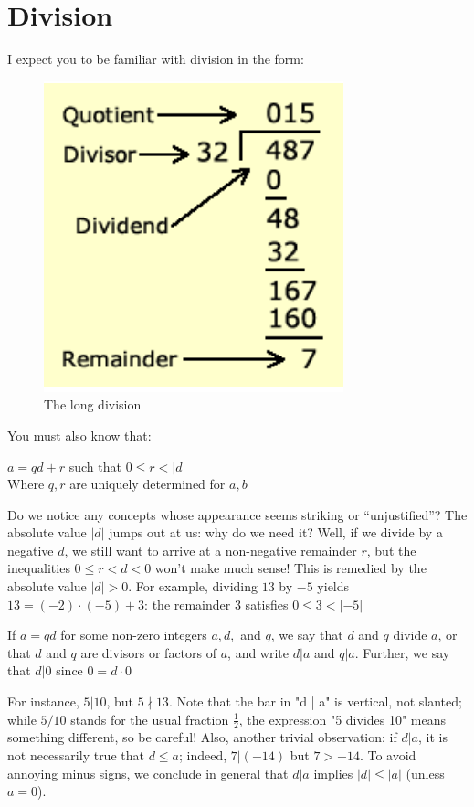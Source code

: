 \section{Division}
I expect you to be familiar with division in the form:\\
\begin{figure} [h]
    \centering
    \includegraphics[width=0.5\linewidth]{Photos/Long Divison.png}
    \caption{The long division}
\end{figure}
You must also know that:\\
\begin{theorem}
    $a = qd+r$ such that $0 \leq r <|d|$\\
    Where $q,r$ are uniquely determined for $a,b$
\end{theorem}
 Do we notice any concepts whose appearance seems striking or “unjustified”? The absolute value $|d|$ jumps out at us: why do we need it? Well, if we divide by a negative $d$, we still want to arrive at a non-negative remainder $r$, but the inequalities $0 \leq r<d< 0$ won’t make much sense! This is remedied by the absolute value $|d| > 0$. For example, dividing $13$ by $-5$ yields $13 = (-2) \cdot (-5) + 3$: the remainder $3$ satisfies $0 \leq 3 < |-5|$\\
 \begin{definition}
     If $a = qd$ for some non-zero integers $a, d,$ and $q$, we say that $d$ and $q$ divide $a$, or that $d$ and $q$ are divisors or factors of $a$, and write $d | a$ and $q | a$. Further, we say that $d | 0$ since $0 = d · 0$
 \end{definition}
For instance, $5 | 10$, but $5 \nmid 13$. Note that the bar in "d | a" is vertical, not slanted; while $5/10$ stands for the usual fraction $\frac{1}{2}$, the expression "5 divides 10" means something different, so be careful! Also, another trivial observation: if $d | a$, it is not necessarily true that $d \leq a$; indeed, $7 | (-14)$ but $7 > -14$. To avoid annoying minus signs, we conclude in general that $d | a$ implies $|d| \leq |a|$ (unless $a = 0$).\\

